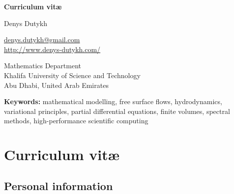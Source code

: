 \documentclass[final, a4paper, oneside, 12pt]{article}
\makeatletter
\numberwithin{equation}{section}
\renewenvironment{titlepage}
 {%
  \if@twocolumn
    \@restonecoltrue\onecolumn
  \else
    \@restonecolfalse\newpage
  \fi
  \thispagestyle{empty}%
 }
 {%
  \if@restonecol
    \twocolumn
  \else
    \newpage
  \fi
 }
\makeatother
\begin{document}
\thispagestyle{empty}


\begin{titlepage}

\vspace*{2cm}
\begin{center}
\Huge\bf Curriculum vit\ae \\
\end{center}
\vspace*{2.7cm}
\begin{center}
\Large\sc Denys Dutykh
\end{center}
\vspace*{0.5em}
\begin{center}
\large
\href{mailto:denys.dutykh@gmail.com}{denys.dutykh@gmail.com} \\
\url{http://www.denys-dutykh.com/}
\end{center}

\vspace*{0.5em}

\begin{center}
\large
Mathematics Department \\
Khalifa University of Science and Technology \\
Abu Dhabi, United Arab Emirates
\end{center}
\vspace*{7cm}
\begin{center}
  \textbf{Keywords:} mathematical modelling, free surface flows, hydrodynamics, variational principles, partial differential equations, finite volumes, spectral methods, high-performance scientific computing
\end{center}

\end{titlepage}


\thispagestyle{empty}
\tableofcontents


\section{Curriculum vit\ae}

\subsection{Personal information}
\end{document}
